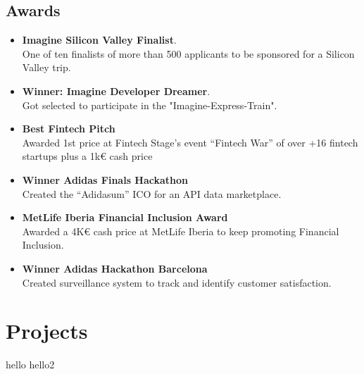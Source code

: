 \documentclass[11pt]{article}
\begin{document}
\begin{minipage}[t]{0.65\textwidth}
\vspace{0.3cm}

\begin{small}
\section*{Awards}
\begin{itemize}
\item \textbf{Imagine Silicon Valley Finalist}. \\
One of ten finalists of more than 500 applicants to be sponsored for a Silicon Valley trip.
\item \textbf{Winner: Imagine Developer Dreamer}. \\
 Got selected to participate in the "Imagine-Express-Train".
\item \textbf{Best Fintech Pitch} \\
Awarded 1st price at Fintech Stage's event ``Fintech War'' of over
+16 fintech startups plus a 1k€ cash price
\item \textbf{Winner Adidas Finals Hackathon} \\
Created the ``Adidasum'' ICO for an API data marketplace.
\item \textbf{MetLife Iberia Financial Inclusion Award} \\
Awarded a 4K€ cash price at MetLife Iberia to keep
promoting Financial Inclusion.
\item \textbf{Winner Adidas Hackathon Barcelona} \\
Created surveillance system to track and identify customer satisfaction.
\end{itemize}
\end{small}
\end{minipage}

\section{Projects}
 hello
 hello2




	
\end{document}

